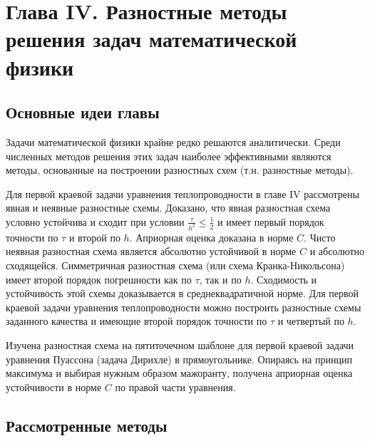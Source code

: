 \newpage
{}
\pagestyle{empty}
\vspace{0.5cm}

\section*{Глава IV. Разностные методы решения задач математической физики}

\subsection{Основные идеи главы}

Задачи математической физики крайне редко решаются аналитически. Среди численных методов решения этих задач наиболее эффективными являются методы, основанные на построении разностных схем (т.н. разностные методы).

Для первой краевой задачи уравнения теплопроводности в главе IV рассмотрены явная и неявные разностные схемы. Доказано, что явная разностная схема условно устойчива и сходит при условии \begin{math} \frac{\tau}{h^2} \leq \frac{1}{2} \end{math} и имеет первый порядок точности по $\tau$ и второй по $h$. Априорная оценка доказана в норме $C$. Чисто неявная разностная схема является абсолютно устойчивой в норме $C$ и абсолютно сходящейся. Симметричная разностная схема (или схема Кранка-Никольсона) имеет второй порядок погрешности как по $\tau$, так и по $h$. Сходимость и устойчивость этой схемы доказывается в среднеквадратичной норме. Для первой краевой задачи уравнения теплопроводности можно построить разностные схемы заданного качества и имеющие второй порядок точности по $\tau$ и четвертый по $h$.

Изучена разностная схема на пятиточечном шаблоне для первой краевой задачи уравнения Пуассона (задача Дирихле) в прямоугольнике. Опираясь на принцип максимума и выбирая нужным образом мажоранту, получена априорная оценка устойчивости в норме $C$ по правой части уравнения.

\subsection{Рассмотренные методы}
